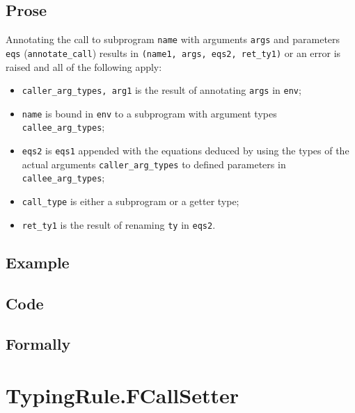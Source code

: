 \documentclass{book}
\begin{document}
  \subsection{Prose}
  Annotating the call to subprogram \texttt{name} with arguments \texttt{args}
and parameters \texttt{eqs} (\texttt{annotate\_call}) results in
\texttt{(name1, args, eqs2, ret\_ty1)} or an error is raised and all of the following apply:
   \begin{itemize}
   \item \texttt{caller\_arg\_types, arg1} is the result of annotating \texttt{args} in \texttt{env};
   \item \texttt{name} is bound in \texttt{env} to a subprogram with argument types
      \texttt{callee\_arg\_types};
   \item \texttt{eqs2} is \texttt{eqs1} appended with the equations deduced by
     using the types of the actual arguments \texttt{caller\_arg\_types} to
     defined parameters in \texttt{callee\_arg\_types};
   \item \texttt{call\_type} is either a subprogram or a getter type;
   \item \texttt{ret\_ty1} is the result of renaming \texttt{ty} in \texttt{eqs2}.
   \end{itemize}

  \subsection{Example}

  \subsection{Code}

\begin{emptyformal}
    \subsection{Formally}
\end{emptyformal}



\section{TypingRule.FCallSetter \label{sec:TypingRule.FCallSetter}}
\end{document}
